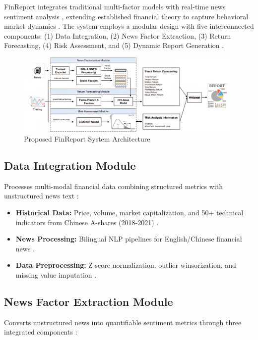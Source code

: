 \documentclass[3p,times,procedia]{elsarticle}
\begin{document}
FinReport integrates traditional multi-factor models \cite{FAMA1993,Carhart1997} with real-time news sentiment analysis \cite{TETLOCK2007}, extending established financial theory to capture behavioral market dynamics \cite{Daniel1998}. The system employs a modular design with five interconnected components: (1) Data Integration, (2) News Factor Extraction, (3) Return Forecasting, (4) Risk Assessment, and (5) Dynamic Report Generation \cite{Fischer2018}.

\begin{figure}[!ht]
    \centering
    \includegraphics[width=0.98\textwidth]{flowchart.jpg}
    \caption{Proposed FinReport System Architecture}
    \label{fig:workflow_diagram}
\end{figure}

\subsection{{Data Integration Module}}

Processes multi-modal financial data combining structured metrics with unstructured news text \cite{Harvey2016}:
\begin{itemize}
\item \textbf{Historical Data:} Price, volume, market capitalization, and 50+ technical indicators from Chinese A-shares (2018-2021) \cite{FinReportDataset2025}.
\item \textbf{News Processing:} Bilingual NLP pipelines for English/Chinese financial news \cite{Loughran2011}.
\item \textbf{Data Preprocessing:} Z-score normalization, outlier winsorization, and missing value imputation \cite{Fischer2018}.
\end{itemize}

\subsection{{News Factor Extraction Module}}

Converts unstructured news into quantifiable sentiment metrics through three integrated components \cite{TETLOCK2007}:
\end{document}
